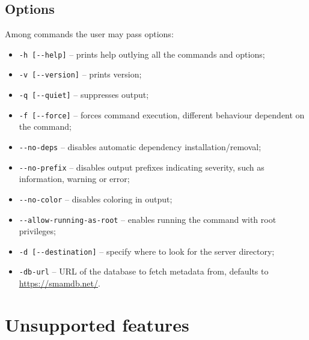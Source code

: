 \subsection{Options}

Among commands the user may pass options:
\begin{itemize}
    \item \verb|-h [--help]| -- prints help outlying all the commands and options;
    \item \verb|-v [--version]| -- prints version;
    \item \verb|-q [--quiet]| -- suppresses output;
    \item \verb|-f [--force]| -- forces command execution, different behaviour dependent on the command;
    \item \verb|--no-deps| -- disables automatic dependency installation/removal;
    \item \verb|--no-prefix| -- disables output prefixes indicating severity, such as information, warning or error;
    \item \verb|--no-color| -- disables coloring in output;
    \item \verb|--allow-running-as-root| -- enables running the command with root privileges;
    \item \verb|-d [--destination]| -- specify where to look for the server directory;
    \item \verb|-db-url| -- URL of the database to fetch metadata from, defaults to \url{https://smamdb.net/}.
\end{itemize}

%
%

\section{Unsupported features}

